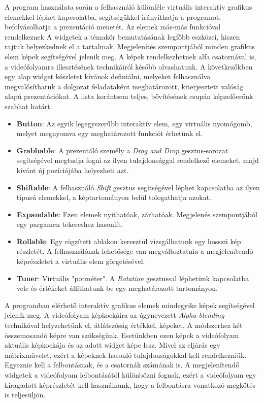 

A program használata során a felhasználó különféle virtuális interaktív grafikus elemekkel léphet kapcsolatba, segítségükkel irányíthatja a programot, befolyásolhatja a prezentáció menetét. Az elemek más-más funkcióval rendelkeznek A widgetek a témakör bemutatásának legfőbb eszközei, hiszen rajtuk helyezkednek el a tartalmak. Megjelenítés szempontjából minden grafikus elem képek segítségével jelenik meg. A képek rendelkezhetnek alfa csatornával is, a videófolyamra illesztésének technikáiról később olvashatunk. A következőkben egy alap widget készletet kívánok definiálni, melyeket felhasználva megvalósíthatuk a dolgozat feladataként meghatározott, kiterjesztett valóság alapú prezentációkat. A lista korántsem teljes, bővítésének csupán képzelőerőnk szabhat határt.
\begin{itemize}
	\item \textbf{Button}: Az egyik legegyszerűbb interaktív elem, egy virtuális nyomógomb, melyet megnyomva egy meghatározott funkciót érhetünk el.
	\item \textbf{Grabbable}: A prezentáló személy a \textit{Drag and Drop} gesztus-sorozat segítségével megtudja fogni az ilyen tulajdonsággal rendelkező elemeket, majd kívánt új pozíciójába helyezheti azt.
	\item \textbf{Shiftable}: A felhasználó \textit{Shift} gesztus segítségével léphet kapcsolatba az ilyen típusú elemekkel, a képtartományon belül tologathatja azokat.
	\item \textbf{Expandable}: Ezen elemek nyithatóak, zárhatóak. Megjelenés szempontjából egy pargamen tekercshez hasonlít.
	\item \textbf{Rollable}: Egy rögzített ablakon keresztül vizsgálhatunk egy hosszú kép részletét. A felhasználónak lehetősége van megváltoztatnia a megjelenítendő képrészletet a virtuális elem görgetésével.
	\item \textbf{Tuner}: Virtuális "potméter". A \textit{Rotation} gesztussal léphetünk kapcsolatba vele és értékeket állíthatunk be egy meghatározott tartományon.
\end{itemize}


A programban elérhető interaktív grafikus elemek mindegyike képek segítségével jelenik meg. A videófolyam képkockáira az úgynevezett \textit{Alpha blending} \cite{salvi2014multi} technikával helyzehetünk el, átlátszóság értékkel, képeket. A módszerhez két összemosandó képre van szükségünk. Esetünkben ezen képek a videófolyam aktuális képkockája és az adott widget képe lesz. Mivel az eljárás egy mátrixművelet, ezért a képeknek hasonló tulajdonságokkal kell rendelkezniük. Egyeznie kell a felbontásnak, és a csatornák számának is. A megjelenítendő widgetek a videófolyam felbontásától különbözni fognak, ezért a videófolyam egy kiragadott képrészletét kell használnunk, hogy a felbontásra vonatkozó megkötés is teljesüljön.

